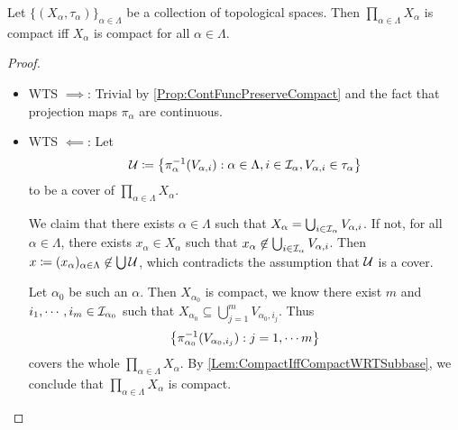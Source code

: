 \documentclass[screen]{techreport}
\numberwithin{equation}{section}
\begin{document}
\begin{theorem}\label{The:Tikhonov}
	Let $\{(X_\alpha,\tau_\alpha)\}_{\alpha \in \Lambda}$ be a collection of topological spaces.
	Then $\prod_{\alpha \in \Lambda} X_\alpha$ is compact iff $X_\alpha$ is compact for all $\alpha \in \Lambda$.
\end{theorem}
\begin{proof}\
	\begin{itemize}
		\item WTS $\implies$: Trivial by \cref{Prop:ContFuncPreserveCompact} and the fact that projection maps $\pi_\alpha$ are continuous.
		\item WTS $\impliedby$: Let
		\[
		\mathcal{U} \coloneqq \left\{ { \pi_\alpha^{-1}(V_{\alpha,i}) : \alpha \in \Lambda, i \in \mathcal{I}_\alpha, V_{\alpha,i} \in \tau_\alpha  } \right\}
		\]
		to be a cover of $\prod_{\alpha \in \Lambda} X_\alpha$.
		
		We claim that there exists $\alpha \in \Lambda$ such that $X_\alpha = \bigcup_{i \in \mathcal{I}_\alpha} V_{\alpha,i}$.
		If not, for all $\alpha \in \Lambda$, there exists $x_\alpha \in X_\alpha$ such that $x_\alpha \not\in \bigcup_{i \in \mathcal{I}_\alpha} V_{\alpha,i}$.
		Then $x \coloneqq (x_\alpha)_{\alpha \in \Lambda} \not\in \bigcup \mathcal{U}$, which contradicts the assumption that $\mathcal{U}$ is a cover.
		
		Let $\alpha_0$ be such an $\alpha$.
		Then $X_{\alpha_0}$ is compact, we know there exist $m$ and $i_1,\cdots,i_m \in \mathcal{I}_{\alpha_0}$ such that $X_{\alpha_0} \subseteq \bigcup_{j=1}^m V_{\alpha_0,i_j}$.
		Thus
		\[
		\left\{ { \pi_{\alpha_0}^{-1}(V_{\alpha_0, i_j}) : j = 1,\cdots m } \right\}
		\]
		covers the whole $\prod_{\alpha \in \Lambda} X_\alpha$.
		By \cref{Lem:CompactIffCompactWRTSubbase}, we conclude that $\prod_{\alpha \in \Lambda} X_\alpha$ is compact.
	\end{itemize}
\end{proof}
\end{document}
